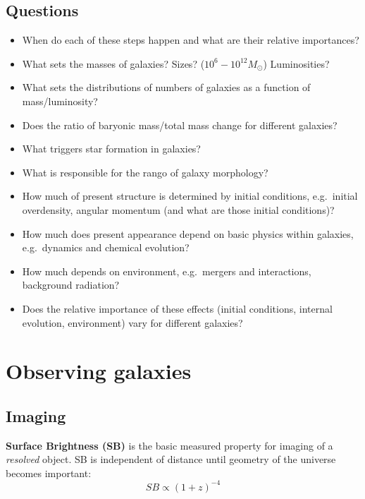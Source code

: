 \documentclass{article}
\begin{document}
\subsection{Questions}
\begin{itemize}
    \item When do each of these steps happen and what are their
        relative importances?
    \item What sets the masses of galaxies? Sizes?
        ($10^6-10^{12}M_\odot$) Luminosities?
    \item What sets the distributions of numbers of galaxies as a
        function of mass/luminosity?
    \item Does the ratio of baryonic mass/total mass change for
        different galaxies?
    \item What triggers star formation in galaxies?
    \item What is responsible for the rango of galaxy morphology?
    \item How much of present structure is determined by initial
        conditions, e.g.\ initial overdensity, angular momentum (and what
        are those initial conditions)?
    \item How much does present appearance depend on basic physics
        within galaxies, e.g.\ dynamics and chemical evolution?
    \item How much depends on environment, e.g.\ mergers and
        interactions, background radiation?
    \item Does the relative importance of these effects (initial
        conditions, internal evolution, environment) vary for different
        galaxies?
\end{itemize}
\newpage


\newpage
\section{Observing galaxies}
\subsection{Imaging}
\textbf{Surface Brightness (SB)} is the basic measured property for imaging of
a \emph{resolved} object.
\textcolor{bred}{SB is independent of distance until geometry of the
universe becomes important:}
\[
    SB \propto (1+z)^{-4}
\]
\end{document}
